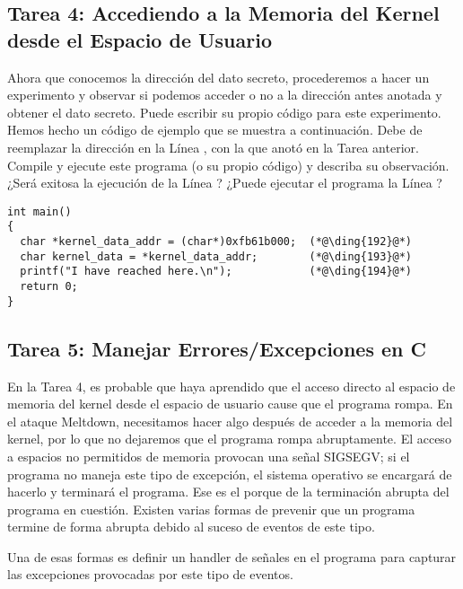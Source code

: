 \subsection{Tarea 4: Accediendo a la Memoria del Kernel desde el Espacio de Usuario}

Ahora que conocemos la dirección del dato secreto, procederemos a hacer un experimento y observar si podemos acceder o no a la dirección antes anotada y obtener el dato secreto.
Puede escribir su propio código para este experimento. Hemos hecho un código de ejemplo que se muestra a continuación. Debe de reemplazar la dirección en la Línea , con la que anotó en la Tarea anterior.
Compile y ejecute este programa (o su propio código) y describa su observación.
¿Será exitosa la ejecución de la Línea ? ¿Puede ejecutar el programa la Línea ?


\begin{lstlisting}
int main()
{
  char *kernel_data_addr = (char*)0xfb61b000;  (*@\ding{192}@*)
  char kernel_data = *kernel_data_addr;        (*@\ding{193}@*)
  printf("I have reached here.\n");            (*@\ding{194}@*)
  return 0;
}
\end{lstlisting}



\subsection{Tarea 5: Manejar Errores/Excepciones en C}

En la Tarea 4, es probable que haya aprendido que el acceso directo al espacio de memoria del kernel desde el espacio de usuario cause que el programa rompa. En el ataque Meltdown, necesitamos hacer algo después de acceder a la memoria del kernel, por lo que no dejaremos que el programa rompa abruptamente. El acceso a espacios no permitidos de memoria provocan una señal SIGSEGV; si el programa no maneja este tipo de excepción, el sistema operativo se encargará de hacerlo y terminará el programa. Ese es el porque de la terminación abrupta del programa en cuestión. Existen varias formas de prevenir que un programa termine de forma abrupta debido al suceso de eventos de este tipo.

Una de esas formas es definir un handler de señales en el programa para capturar las excepciones provocadas por este tipo de eventos.


